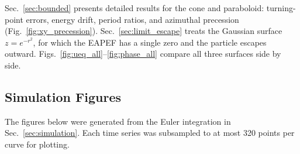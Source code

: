 \documentclass[11pt,letterpaper]{article}
\begin{document}
Sec.~\ref{sec:bounded} presents detailed results for the cone and paraboloid: turning-point errors, energy drift, period ratios, and azimuthal precession (Fig.~\ref{fig:xy_precession}). Sec.~\ref{sec:limit_escape} treats the Gaussian surface $z=e^{-r^2}$, for which the EAPEF has a single zero and the particle escapes outward. Figs.~\ref{fig:ueq_all}--\ref{fig:phase_all} compare all three surfaces side by side.

\subsection{Simulation Figures}
\label{sec:graphs}

The figures below were generated from the Euler integration in Sec.~\ref{sec:simulation}. Each time series was subsampled to at most 320 points per curve for plotting.
\end{document}
